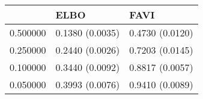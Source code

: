\begin{tabular}{lll}
\toprule
 & ELBO & FAVI \\
\midrule
0.500000 & 0.1380 (0.0035) & 0.4730 (0.0120) \\
0.250000 & 0.2440 (0.0026) & 0.7203 (0.0145) \\
0.100000 & 0.3440 (0.0092) & 0.8817 (0.0057) \\
0.050000 & 0.3993 (0.0076) & 0.9410 (0.0089) \\
\bottomrule
\end{tabular}

